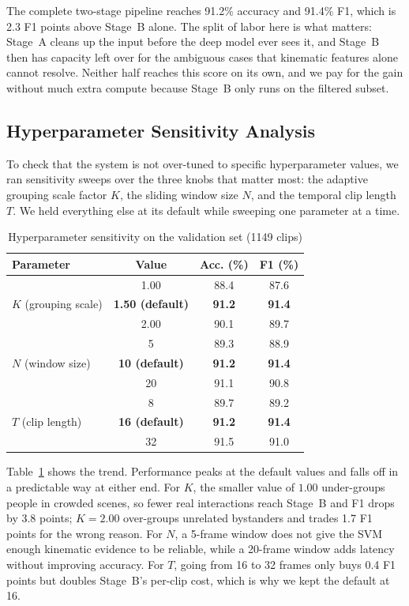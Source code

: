 \documentclass[conference]{IEEEtran}
\begin{document}
The complete two-stage pipeline reaches 91.2\% accuracy and 91.4\% F1, which is 2.3 F1 points above Stage~B alone. The split of labor here is what matters: Stage~A cleans up the input before the deep model ever sees it, and Stage~B then has capacity left over for the ambiguous cases that kinematic features alone cannot resolve. Neither half reaches this score on its own, and we pay for the gain without much extra compute because Stage~B only runs on the filtered subset.

\subsection{Hyperparameter Sensitivity Analysis}

To check that the system is not over-tuned to specific hyperparameter values, we ran sensitivity sweeps over the three knobs that matter most: the adaptive grouping scale factor $K$, the sliding window size $N$, and the temporal clip length $T$. We held everything else at its default while sweeping one parameter at a time.

\begin{table}[!htbp]
\centering
\caption{Hyperparameter sensitivity on the validation set (1149 clips)}
\label{tab:sensitivity}
\begin{tabular}{lccc}
\hline
\textbf{Parameter} & \textbf{Value} & \textbf{Acc. (\%)} & \textbf{F1 (\%)} \\
\hline
\multirow{3}{*}{$K$ (grouping scale)} & 1.00 & 88.4 & 87.6 \\
 & \textbf{1.50 (default)} & \textbf{91.2} & \textbf{91.4} \\
 & 2.00 & 90.1 & 89.7 \\
\hline
\multirow{3}{*}{$N$ (window size)} & 5  & 89.3 & 88.9 \\
 & \textbf{10 (default)} & \textbf{91.2} & \textbf{91.4} \\
 & 20 & 91.1 & 90.8 \\
\hline
\multirow{3}{*}{$T$ (clip length)} & 8  & 89.7 & 89.2 \\
 & \textbf{16 (default)} & \textbf{91.2} & \textbf{91.4} \\
 & 32 & 91.5 & 91.0 \\
\hline
\end{tabular}
\end{table}

Table~\ref{tab:sensitivity} shows the trend. Performance peaks at the default values and falls off in a predictable way at either end. For $K$, the smaller value of $1.00$ under-groups people in crowded scenes, so fewer real interactions reach Stage~B and F1 drops by 3.8 points; $K=2.00$ over-groups unrelated bystanders and trades 1.7 F1 points for the wrong reason. For $N$, a 5-frame window does not give the SVM enough kinematic evidence to be reliable, while a 20-frame window adds latency without improving accuracy. For $T$, going from 16 to 32 frames only buys 0.4 F1 points but doubles Stage~B's per-clip cost, which is why we kept the default at 16.
\end{document}
